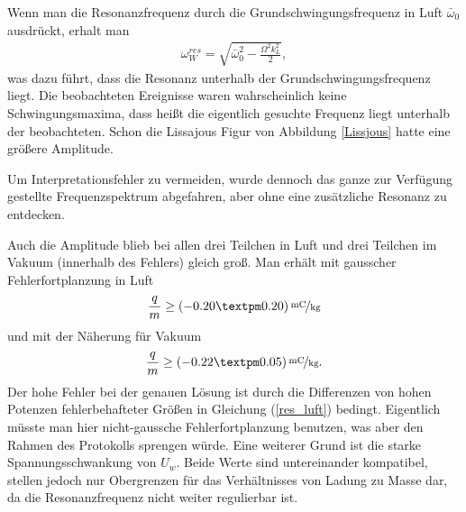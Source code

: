 \documentclass[a4paper,12pt]{article}
\begin{document}
Wenn man die Resonanzfrequenz durch die Grundschwingungsfrequenz in Luft $\bar{ω}_0$ ausdrückt, erhalt man
\begin{align*}
	ω^{res}_W = \sqrt{ \bar{ω}_0^2 - \frac{Ω^2k_L^2}{2} },
\end{align*}
was dazu führt, dass die Resonanz unterhalb der Grundschwingungsfrequenz liegt.
Die beobachteten Ereignisse waren wahrscheinlich keine Schwingungsmaxima, dass heißt die eigentlich gesuchte Frequenz liegt unterhalb der beobachteten.
Schon die Lissajous Figur von Abbildung \ref{Lissjous} hatte eine größere Amplitude.

Um Interpretationsfehler zu vermeiden, wurde dennoch das ganze zur Verfügung gestellte Frequenzspektrum abgefahren, aber ohne eine zusätzliche Resonanz zu entdecken.

Auch die Amplitude blieb bei allen drei Teilchen in Luft und drei Teilchen im Vakuum (innerhalb des Fehlers) gleich groß.
Man erhält mit gausscher Fehlerfortplanzung in Luft
$$\frac{q}{m} \geq \unitfrac[( -0.20 ± 0.20 )]{mC}{kg}$$
und mit der Näherung für Vakuum
$$\frac{q}{m} \geq \unitfrac[( -0.22 ± 0.05 ) ]{mC}{kg}.$$
Der hohe Fehler bei der genauen Lösung ist durch die Differenzen von hohen Potenzen fehlerbehafteter Größen in Gleichung (\ref{res_luft}) bedingt.
Eigentlich müsste man hier nicht-gaussche Fehlerfortplanzung benutzen, was aber den Rahmen des Protokolls sprengen würde.
Eine weiterer Grund ist die starke Spannungsschwankung von  $U_w$.
Beide Werte sind untereinander kompatibel, stellen jedoch nur Obergrenzen für das Verhältnisses von Ladung zu Masse dar, da die Resonanzfrequenz nicht weiter regulierbar ist.
\end{document}

